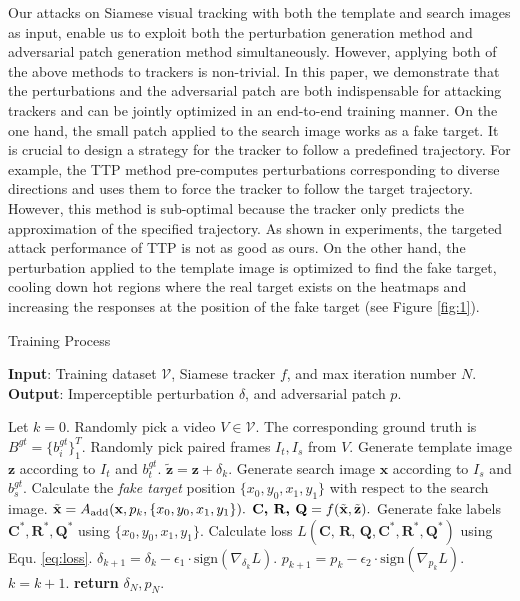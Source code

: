 \documentclass[journal]{IEEEtran}
\begin{document}
Our attacks on Siamese visual tracking with both the template and search images as input, enable us to exploit both the perturbation generation method \cite{FGSM} and adversarial patch generation method \cite{patch} simultaneously. However, applying both of the above methods to trackers is non-trivial. In this paper, we demonstrate that the perturbations and the adversarial patch are both indispensable for attacking trackers and can be jointly optimized in an end-to-end training manner. On the one hand, the small patch applied to the search image works as a fake target. It is crucial to design a strategy for the tracker to follow a predefined trajectory. For example, the TTP method \cite{TTP} pre-computes perturbations corresponding to diverse directions and uses them to force the tracker to follow the target trajectory. However, this method is sub-optimal because the tracker only predicts the approximation of the specified trajectory. As shown in experiments, the targeted attack performance of TTP is not as good as ours. On the other hand, the perturbation applied to the template image is optimized to find the fake target, cooling down hot regions where the real target exists on the heatmaps and increasing the responses at the position of the fake target (see Figure \ref{fig:1}).

\begin{algorithm}[tb]
  \caption{Training Process}
  \label{alg:algorithm}
  \textbf{Input}: Training dataset $\mathcal{V}$, Siamese tracker $f$, and max iteration number $N$.\\
  \textbf{Output}: Imperceptible perturbation $\delta$, and adversarial patch $p$.
  \begin{algorithmic}[1] %
  \STATE Let $k = 0$.
  \STATE Randomly pick a video $V\in \mathcal{V}$. The corresponding ground truth is $B^{gt}=\{b^{gt}_i\}^T_1$.
  \STATE Randomly pick paired frames $I_t, I_s$ from $V$.
  \STATE Generate template image $\textbf{z}$ according to $I_t$ and $b^{gt}_t$.
  \STATE $\tilde{\textbf{z}} = \textbf{z} + \delta_k.$
  \STATE Generate search image $\textbf{x}$ according to $I_s$ and $b^{gt}_s$.
  \STATE Calculate the \textit{fake target} position $\{x_0, y_0, x_1, y_1\}$ with respect to the search image.
  \STATE $\tilde{\textbf x} = A_{\text{add}}(\textbf x, p_k, \{x_0, y_0, x_1, y_1\}).$
  \STATE $\textbf{C, R, Q} = f(\tilde {\textbf x}, \tilde{\textbf z}).$
  \STATE Generate fake labels $\textbf{C}^*,\textbf{R}^*,\textbf{Q}^*$ using $\{x_0, y_0, x_1, y_1\}$.
  \STATE Calculate loss $L(\textbf{C, R, Q}, \textbf{C}^*, \textbf{R}^*, \textbf{Q}^*)$ using Equ. \ref{eq:loss}.
  \STATE $\delta_{k+1} = \delta_{k} - \epsilon_1 \cdot \text{sign}(\nabla_{\delta_k}L).$
  \STATE $p_{k+1} = p_{k} - \epsilon_2 \cdot \text{sign}(\nabla_{p_k}L).$
  \STATE $k = k + 1.$
  \ENDWHILE
  \STATE \textbf{return} $\delta_N, p_N.$
  \end{algorithmic}
  \label{alg}
\end{algorithm}
\end{document}
